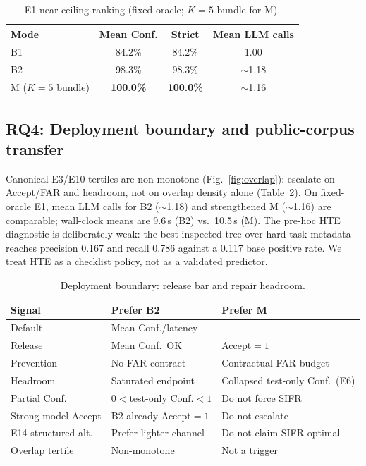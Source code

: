 \documentclass[10pt,conference]{IEEEtran}
\begin{document}
\begin{table}[t]
\centering
\caption{E1 near-ceiling ranking (fixed oracle; $K{=}5$ bundle for M).}
\label{tab:e1}
\footnotesize
\begin{tabular}{lccc}
\toprule
Mode & Mean Conf. & Strict & Mean LLM calls \\
\midrule
B1 & 84.2\% & 84.2\% & 1.00 \\
B2 & 98.3\% & 98.3\% & $\sim$1.18 \\
M ($K{=}5$ bundle) & \textbf{100.0\%} & \textbf{100.0\%} & $\sim$1.16 \\
\bottomrule
\end{tabular}
\end{table}

\subsection{RQ4: Deployment boundary and public-corpus transfer}
Canonical E3/E10 tertiles are non-monotone (Fig.~\ref{fig:overlap}): escalate
on Accept/FAR and headroom, not on overlap density alone
(Table~\ref{tab:deploy}).
On fixed-oracle E1, mean LLM calls for B2 ($\sim$1.18) and strengthened M
($\sim$1.16) are comparable; wall-clock means are 9.6\,s (B2) vs.\ 10.5\,s (M).
The pre-hoc HTE diagnostic is deliberately weak: the best inspected tree over
hard-task metadata reaches precision 0.167 and recall 0.786 against a 0.117
base positive rate.
We treat HTE as a checklist policy, not as a validated predictor.

\begin{table}[t]
\centering
\caption{Deployment boundary: release bar and repair headroom.}
\label{tab:deploy}
\footnotesize
\begin{tabular}{@{}lll@{}}
\toprule
Signal & Prefer B2 & Prefer M \\
\midrule
Default & Mean Conf./latency & --- \\
Release & Mean Conf.\ OK & Accept${=}1$ \\
Prevention & No FAR contract & Contractual FAR budget \\
Headroom & Saturated endpoint & Collapsed test-only Conf.\ (E6) \\
Partial Conf. & $0{<}$test-only Conf.${<}1$ & Do not force SIFR \\
Strong-model Accept & B2 already Accept${=}1$ & Do not escalate \\
E14 structured alt. & Prefer lighter channel & Do not claim SIFR-optimal \\
Overlap tertile & Non-monotone & Not a trigger \\
\bottomrule
\end{tabular}
\end{table}
\end{document}
